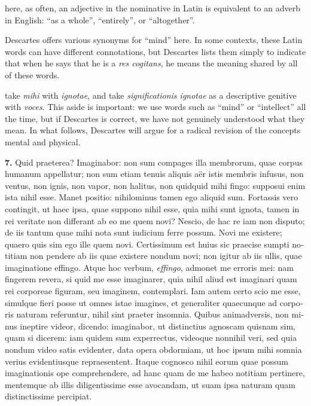  here, as often, an adjective in the nominative in Latin is equivalent to an adverb in English: ``as a whole'', ``entirely'', or ``altogether''.

 Descartes offers various synonyms for ``mind'' here. In some contexts, these Latin words can have different connotations, but Descartes lists them simply to indicate that when he says that he is a \textit{res cogitans}, he means the meaning shared by all of these words.

 take \textit{mihi} with \textit{ignotae}, and take \textit{significationis ignotae} as a descriptive genitive with \textit{voces}. This aside is important: we use words such as ``mind'' or ``intellect'' all the time, but if Descartes is correct, we have not genuinely understood what they mean. In what follows, Descartes will argue for a radical revision of the concepts mental and physical.

\clearpage

\beginnumbering
\pstart
\begin{latin}
    \textenglish{\textbf{7.}} Quid praeterea? Imaginabor: non sum compages illa membrorum, quae corpus humanum appellatur; non sum etiam tenuis aliquis aër istis membris infusus, non ventus, non ignis, non vapor, non halitus, non quidquid mihi fingo: supposui enim ista nihil esse. Manet positio: nihilominus tamen ego aliquid sum. Fortassis vero contingit, ut haec ipsa, quae suppono nihil esse, quia mihi sunt ignota, tamen in rei veritate non differant ab eo me quem novi? Nescio, de hac re iam non disputo; de iis tantum quae mihi nota sunt iudicium ferre possum. Novi me existere; quaero quis sim ego ille quem novi. Certissimum est huius sic praecise sumpti notitiam non pendere ab iis quae existere nondum novi; non igitur ab iis ullis, quae imaginatione effingo. Atque hoc verbum, \textit{effingo}, admonet me erroris mei: nam fingerem revera, si quid me esse imaginarer, quia nihil aliud est imaginari quam rei corporeae figuram, seu imaginem, contemplari. Iam autem certo scio me esse, simulque fieri posse ut omnes istae imagines, et generaliter quaecunque ad corporis naturam referuntur, nihil sint praeter insomnia. Quibus animadversis, non minus ineptire videor, dicendo: imaginabor, ut distinctius agnoscam quisnam sim, quam si dicerem: iam quidem sum experrectus, videoque nonnihil veri, sed quia nondum video satis evidenter, data opera obdormiam, ut hoc ipsum mihi somnia verius evidentiusque repraesentent. Itaque cognosco nihil eorum quae possum imaginationis ope comprehendere, ad hanc quam de me habeo notitiam pertinere, mentemque ab illis diligentissime esse avocandam, ut suam ipsa naturam quam distinctissime percipiat.
\end{latin}
\pend
\endnumbering

